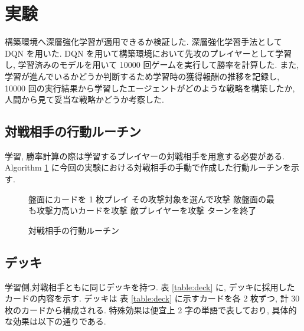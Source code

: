 \documentclass[twocolumn]{jarticle}
\begin{document}
\section{実験}
構築環境へ深層強化学習が適用できるか検証した.
深層強化学習手法として DQN を用いた. DQN を用いて構築環境において先攻のプレイヤーとして学習し, 学習済みのモデルを用いて 10000 回ゲームを実行して勝率を計算した. また, 学習が進んでいるかどうか判断するため学習時の獲得報酬の推移を記録し, 10000 回の実行結果から学習したエージェントがどのような戦略を構築したか, 人間から見て妥当な戦略かどうか考察した.

\subsection{対戦相手の行動ルーチン}

学習, 勝率計算の際は学習するプレイヤーの対戦相手を用意する必要がある.
Algorithm \ref{alg1} に今回の実験における対戦相手の手動で作成した行動ルーチンを示す.
\begin{figure}[t]
  \vspace{-0.3cm}
  \begin{algorithm}[H]
    \small
      \caption{
        対戦相手の行動ルーチン
        }
      \label{alg1}
      \begin{algorithmic}[1] 
      \STATE 盤面にカードを 1 枚プレイ
      \STATE その攻撃対象を選んで攻撃
      \ELSE
      \STATE 敵盤面の最も攻撃力高いカードを攻撃
      \ELSE
      \STATE 敵プレイヤーを攻撃
      \ENDIF
      \ENDIF
      \ENDFOR
      \STATE ターンを終了
      \end{algorithmic}
  \end{algorithm}
  \vspace{-0.3cm}
  \end{figure}


\subsection{デッキ}
学習側,対戦相手ともに同じデッキを持つ.
表 \ref{table:deck} に, デッキに採用したカードの内容を示す. デッキは 表 \ref{table:deck} に示すカードを各 2 枚ずつ, 計 30 枚のカードから構成される. 
特殊効果は便宜上 2 字の単語で表しており, 具体的な効果は以下の通りである.
\end{document}
